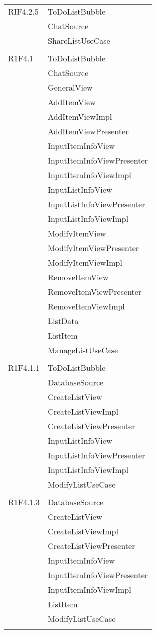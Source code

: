 \begin{center}
\begin{longtable}{|p{7cm}|p{7cm}|}
		RIF4.2.5 & ToDoListBubble \\ & ChatSource \\ & ShareListUseCase \\ & \\ \hline
		R1F4.1 & ToDoListBubble \\ & ChatSource \\ & GeneralView \\ & AddItemView \\ & AddItemViewImpl \\ & AddItemViewPresenter \\ & InputItemInfoView \\ & InputItemInfoViewPresenter \\ & InputItemInfoViewImpl \\ & InputListInfoView \\ & InputListInfoViewPresenter \\ & InputListInfoViewImpl \\ & ModifyItemView \\ & ModifyItemViewPresenter \\ & ModifyItemViewImpl \\ & RemoveItemView \\ & RemoveItemViewPresenter \\ & RemoveItemViewImpl \\ & ListData \\ & ListItem \\ & ManageListUseCase \\ & \\ \hline
		R1F4.1.1 & ToDoListBubble \\ & DatabaseSource \\ & CreateListView \\ & CreateListViewImpl \\ & CreateListViewPresenter \\ & InputListInfoView \\ & InputListInfoViewPresenter \\ & InputListInfoViewImpl \\ & ModifyListUseCase \\ & \\ \hline
		R1F4.1.3 & DatabaseSource \\ & CreateListView \\ & CreateListViewImpl \\ & CreateListViewPresenter \\ & InputItemInfoView \\ & InputItemInfoViewPresenter \\ & InputItemInfoViewImpl \\ & ListItem \\ & ModifyListUseCase \\ & \\ \hline

\end{longtable}
\end{center}
